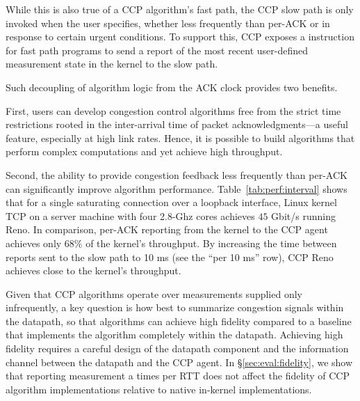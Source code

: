 While this is also true of a CCP algorithm's fast path, the CCP slow path is
only invoked when the user specifies, whether less frequently than per-ACK or in response to certain urgent conditions.
%
To support this, CCP exposes a  instruction for fast path programs to send a
report of the most recent user-defined measurement state in the kernel to the slow path.
\fi

Such decoupling of algorithm logic from the ACK clock provides two benefits.

First, users can develop congestion control algorithms free from the strict
time restrictions rooted in the inter-arrival time of packet acknowledgments---a useful feature, especially at high link rates.
Hence, it is possible to build algorithms that perform complex computations and yet achieve high throughput.

Second, the ability to provide congestion feedback less frequently than per-ACK can significantly improve algorithm performance. 
%
Table~\ref{tab:perf:interval} shows that for a single saturating 
connection over a loopback interface, Linux kernel TCP on a server machine
with four 2.8-Ghz cores achieves $45$ Gbit/s running Reno.
%
In comparison, per-ACK reporting from the kernel to the CCP agent achieves
only 68\% of the kernel's throughput.
%
By increasing the time between reports sent to the slow path to 10 ms (see the
``per 10 ms'' row), CCP Reno achieves close to the kernel's throughput.

Given that CCP algorithms operate over measurements supplied only infrequently, a key question is
how best to summarize congestion signals within the datapath, so that algorithms can achieve high fidelity compared to a baseline that implements the
algorithm completely within the datapath.
Achieving high fidelity requires a careful design of the datapath component and the information channel between the datapath and the CCP agent.
In \S\ref{sec:eval:fidelity}, we show that reporting measurement a times per RTT does not affect the fidelity of CCP algorithm
implementations relative to native in-kernel implementations.

